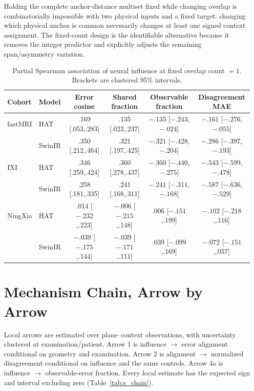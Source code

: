 \documentclass[10pt,twocolumn,letterpaper]{article}
\begin{document}
Holding the complete anchor-distance multiset fixed while changing overlap is combinatorially impossible with two physical inputs and a fixed target: changing which physical anchor is common necessarily changes at least one signed context assignment. The fixed-count design is the identifiable alternative because it removes the integer predictor and explicitly adjusts the remaining span/asymmetry variation.

\begin{table}[t]
\centering
\caption{Partial Spearman association of neural influence at fixed overlap count $=1$. Brackets are clustered 95\% intervals.}
\label{tab:s_fixed}
\scriptsize
\setlength{\tabcolsep}{3.0pt}
\begin{tabular}{llcccc}
\toprule
Cohort&Model&Error cosine&Shared fraction&Observable fraction&Disagreement MAE\\
\midrule
fastMRI&HAT&.169 [.053,.283]&.135 [.023,.237]&$-.135$ [$-.243$,$-.024$]&$-.161$ [$-.276$,$-.055$]\\
&SwinIR&.350 [.212,.464]&.321 [.197,.425]&$-.321$ [$-.428$,$-.204$]&$-.286$ [$-.397$,$-.193$]\\
IXI&HAT&.346 [.259,.424]&.360 [.278,.437]&$-.360$ [$-.440$,$-.275$]&$-.543$ [$-.599$,$-.478$]\\
&SwinIR&.258 [.181,.335]&.241 [.168,.311]&$-.241$ [$-.311$,$-.168$]&$-.587$ [$-.636$,$-.529$]\\
NingXia&HAT&.014 [$-.232$,.223]&$-.006$ [$-.215$,.148]&.006 [$-.151$,.199]&$-.102$ [$-.218$,.116]\\
&SwinIR&$-.039$ [$-.175$,.144]&$-.039$ [$-.171$,.111]&.039 [$-.099$,.169]&$-.072$ [$-.151$,.057]\\
\bottomrule
\end{tabular}
\end{table}

\section{Mechanism Chain, Arrow by Arrow}
Local arrows are estimated over plane--context observations, with uncertainty clustered at examination/patient. Arrow 1 is influence $\rightarrow$ error alignment conditional on geometry and examination. Arrow 2 is alignment $\rightarrow$ normalized disagreement conditional on influence and the same controls. Arrow 4a is influence $\rightarrow$ observable-error fraction. Every local estimate has the expected sign and interval excluding zero (Table~\ref{tab:s_chain}).
\end{document}
